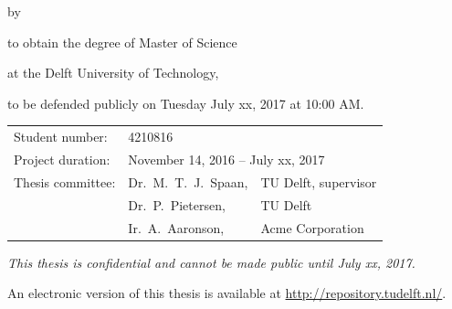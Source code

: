 \begin{titlepage}


\begin{center}


{\makeatletter
\largetitlestyle\fontsize{36}{94}\selectfont\@title										%
\makeatother}

{\makeatletter
\ifx\@subtitle\undefined\else
    \bigskip
   {\tudsffamily\fontsize{22}{32}\selectfont\@subtitle}    
\fi
\makeatother}

\bigskip
\bigskip

by

\bigskip
\bigskip

{\makeatletter
\largetitlestyle\fontsize{20}{26}\selectfont\@author
\makeatother}

\bigskip
\bigskip

to obtain the degree of Master of Science

at the Delft University of Technology,

to be defended publicly on Tuesday July xx, 2017 at 10:00 AM.

\vfill

\begin{tabular}{lll}
    Student number: & 4210816 \\
    Project duration: & \multicolumn{2}{l}{November 14, 2016 -- July xx, 2017} \\
    Thesis committee: & Dr.\ M.\ T.\ J.\ Spaan, & TU Delft, supervisor \\
        & Dr.\ P.\ Pietersen, & TU Delft \\												%
        & Ir.\ A.\ Aaronson, & Acme Corporation											%
\end{tabular}

\bigskip
\bigskip
\emph{This thesis is confidential and cannot be made public until July xx, 2017.}

\bigskip
\bigskip
An electronic version of this thesis is available at \url{http://repository.tudelft.nl/}.


\end{center}
\end{titlepage}
